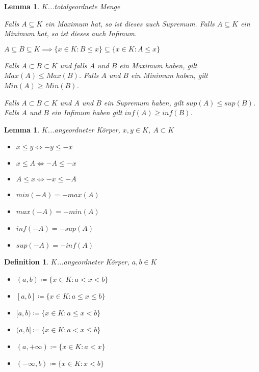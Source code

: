 \documentclass[twocolumn]{article}
\newtheorem{lemma}[theorem]{Lemma}
\newtheorem{definition}{Definition}[section]
\newcommand*{\logeq}{\Leftrightarrow}
\begin{document}
\begin{lemma}
	$K$...totalgeordnete Menge
	
	Falls $A \subseteq K$ ein Maximum hat, so ist dieses auch Supremum. Falls $A \subseteq K$ ein Minimum hat, so ist dieses auch Infimum.
	
	$A \subseteq B \subseteq K \implies \{x \in K : B \leq x\} \subseteq \{x \in K : A \leq x\}$
	
	Falls $A \subset B \subset K$ und falls $A$ und $B$ ein Maximum haben, gilt $Max(A) \leq Max(B)$. Falls $A$ und $B$ ein Minimum haben, gilt $Min(A) \geq Min(B)$.
	
	Falls $A \subset B \subset K$ und $A$ und $B$ ein Supremum haben, gilt $sup(A) \leq sup(B)$. Falls $A$ und $B$ ein Infimum haben gilt $inf(A) \geq inf(B)$.
\end{lemma}

\begin{lemma}
	$K$...angeordneter Körper, $x,y \in K$, $A \subset K$
	
	\begin{itemize}
		\item $x \leq y \logeq -y \leq -x$
		\item $x \leq A \logeq -A \leq -x$
		\item $A \leq x \logeq -x \leq -A$
		\item $min(-A) = -max(A)$
		\item $max(-A) = -min(A)$
		\item $inf(-A) = -sup(A)$
		\item $sup(-A) = -inf(A)$
	\end{itemize}
\end{lemma}

\begin{definition}
	$K$...angeordneter Körper, $a,b \in K$
	
	\begin{itemize}
		\item $(a, b) \coloneqq \{x \in K : a < x < b\}$
		\item $[a, b] \coloneqq \{x \in K : a \leq x \leq b\}$
		\item $[a, b) \coloneqq \{x \in K : a \leq x < b\}$
		\item $(a, b] \coloneqq \{x \in K : a < x \leq b\}$
		\item $(a, +\infty) \coloneqq \{x \in K : a < x\}$
		\item $(-\infty, b) \coloneqq \{x \in K : x < b\}$
	\end{itemize}
\end{definition}
\end{document}
